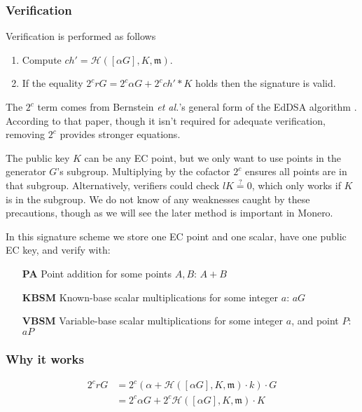 \subsubsection{Verification}
Verification is performed as follows

\begin{enumerate}
	
	\item Compute \(ch' = \mathcal{H}([\alpha G], K,  \mathfrak{m}) \).
	
	\item If the equality \(2^c r G = 2^c \alpha G + 2^c ch'*K \) holds then the signature is valid.
	
\end{enumerate}

The $2^c$ term comes from Bernstein {\em et al.}’s general form of the EdDSA algorithm \cite{Bernstein2007}. According to that paper, though it isn’t required for adequate verification, removing $2^c$ provides stronger equations.

The public key $K$ can be any EC point, but we only want to use points in the generator $G$'s subgroup. Multiplying by the cofactor $2^c$ ensures all points are in that subgroup. Alternatively, verifiers could check $l K \stackrel{?}{=} 0$, which only works if $K$ is in the subgroup. We do not know of any weaknesses caught by these precautions, though as we will see the later method is important in Monero.

In this signature scheme we store one EC point and one scalar, have one public EC key, and verify with:

\begin{itemize}
    \setlength\itemsep{\listspace}
    \item [\textbf{PA}] Point addition for some points $A, B$: $A + B$ \quad [1]
    \item [\textbf{KBSM}] Known-base scalar multiplications for some integer $a$: $a G$ \quad [1]
    \item [\textbf{VBSM}] Variable-base scalar multiplications for some integer $a$, and point $P$: $a P$ \quad [1]
\end{itemize}


\subsubsection{Why it works}

\begin{align*}
2^c r G &= 2^c (\alpha + \mathcal{H}([\alpha G], K,  \mathfrak{m}) \cdot k) \cdot G \\
		&= 2^c \alpha G + 2^c \mathcal{H}([\alpha G], K,  \mathfrak{m}) \cdot K 
\end{align*}


